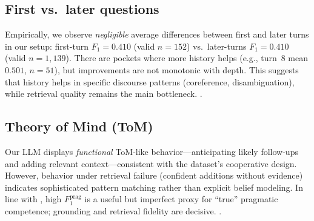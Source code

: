 \documentclass[12pt, letterpaper]{article}
\begin{document}
\subsection*{First vs.\ later questions}
{}
Empirically, we observe \emph{negligible} average differences between first and later turns in our setup: first-turn \(F_1{=}0.410\) (valid \(n{=}152\)) vs.\ later-turns \(F_1{=}0.410\) (valid \(n{=}1{,}139\)). There are pockets where more history helps (e.g., turn~8 mean \(0.501\), \(n{=}51\)), but improvements are not monotonic with depth. This suggests that history helps in specific discourse patterns (coreference, disambiguation), while retrieval quality remains the main bottleneck.
\citep{pragmaticqa2023}.
\subsection*{Theory of Mind (ToM)}
{}
Our LLM displays \emph{functional} ToM-like behavior—anticipating likely follow-ups and adding relevant context—consistent with the dataset’s cooperative design. However, behavior under retrieval failure (confident additions without evidence) indicates sophisticated pattern matching rather than explicit belief modeling. In line with \citet{pragmaticqa2023}, high \(F^{\text{prag}}_1\) is a useful but imperfect proxy for “true” pragmatic competence; grounding and retrieval fidelity are decisive.
 \citep{pragmaticqa2023}.

\newpage
 

\end{document}
